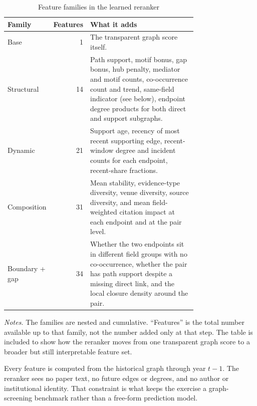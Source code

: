 \documentclass[11pt]{article}
\newcommand{\fignotes}[1]{\caption*{\textit{Notes.} #1}}
\begin{document}
\begin{table}[h]
  \caption{Feature families in the learned reranker}
  \label{tab:feature-families}
  \centering
  \small
  \begin{tabular}{L{0.15\linewidth}rL{0.60\linewidth}}
    \toprule
    Family & Features & What it adds \\
    \midrule
    Base & 1 & The transparent graph score itself. \\
    Structural & 14 & Path support, motif bonus, gap bonus, hub penalty, mediator and motif counts, co-occurrence count and trend, same-field indicator (see below), endpoint degree products for both direct and support subgraphs. \\
    Dynamic & 21 & Support age, recency of most recent supporting edge, recent-window degree and incident counts for each endpoint, recent-share fractions. \\
    Composition & 31 & Mean stability, evidence-type diversity, venue diversity, source diversity, and mean field-weighted citation impact at each endpoint and at the pair level. \\
    Boundary + gap & 34 & Whether the two endpoints sit in different field groups with no co-occurrence, whether the pair has path support despite a missing direct link, and the local closure density around the pair. \\
    \bottomrule
  \end{tabular}
  \fignotes{The families are nested and cumulative. ``Features'' is the total number available up to that family, not the number added only at that step. The table is included to show how the reranker moves from one transparent graph score to a broader but still interpretable feature set.}
\end{table}

Every feature is computed from the historical graph through year \(t-1\). The reranker sees no paper text, no future edges or degrees, and no author or institutional identity. That constraint is what keeps the exercise a graph-screening benchmark rather than a free-form prediction model.
\end{document}
